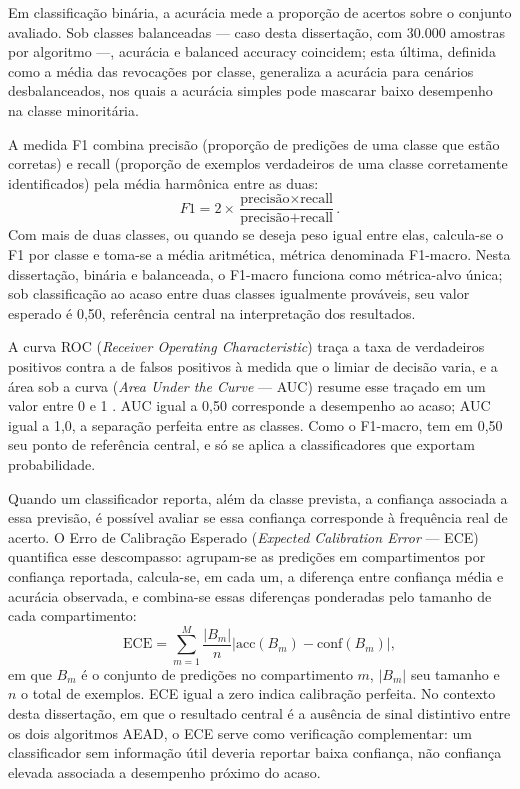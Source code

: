 Em classificação binária, a acurácia mede a proporção de acertos sobre o conjunto avaliado. Sob classes balanceadas --- caso desta dissertação, com 30.000 amostras por algoritmo ---, acurácia e balanced accuracy coincidem; esta última, definida como a média das revocações por classe, generaliza a acurácia para cenários desbalanceados, nos quais a acurácia simples pode mascarar baixo desempenho na classe minoritária.

A medida F1 combina precisão (proporção de predições de uma classe que estão corretas) e recall (proporção de exemplos verdadeiros de uma classe corretamente identificados) pela média harmônica entre as duas:
\begin{equation}
F1 = 2 \times \frac{\text{precisão} \times \text{recall}}{\text{precisão} + \text{recall}}.
\end{equation}
Com mais de duas classes, ou quando se deseja peso igual entre elas, calcula-se o F1 por classe e toma-se a média aritmética, métrica denominada F1-macro. Nesta dissertação, binária e balanceada, o F1-macro funciona como métrica-alvo única; sob classificação ao acaso entre duas classes igualmente prováveis, seu valor esperado é 0,50, referência central na interpretação dos resultados.

A curva ROC (\emph{Receiver Operating Characteristic}) traça a taxa de verdadeiros positivos contra a de falsos positivos à medida que o limiar de decisão varia, e a área sob a curva (\emph{Area Under the Curve} --- AUC) resume esse traçado em um valor entre 0 e 1 \cite{fawcett2006}. AUC igual a 0,50 corresponde a desempenho ao acaso; AUC igual a 1,0, a separação perfeita entre as classes. Como o F1-macro, tem em 0,50 seu ponto de referência central, e só se aplica a classificadores que exportam probabilidade.

Quando um classificador reporta, além da classe prevista, a confiança associada a essa previsão, é possível avaliar se essa confiança corresponde à frequência real de acerto. O Erro de Calibração Esperado (\emph{Expected Calibration Error} --- ECE) quantifica esse descompasso: agrupam-se as predições em compartimentos por confiança reportada, calcula-se, em cada um, a diferença entre confiança média e acurácia observada, e combina-se essas diferenças ponderadas pelo tamanho de cada compartimento:
\begin{equation}
\text{ECE} = \sum_{m=1}^{M} \frac{|B_m|}{n} \left| \text{acc}(B_m) - \text{conf}(B_m) \right|,
\end{equation}
em que $B_m$ é o conjunto de predições no compartimento $m$, $|B_m|$ seu tamanho e $n$ o total de exemplos. ECE igual a zero indica calibração perfeita. No contexto desta dissertação, em que o resultado central é a ausência de sinal distintivo entre os dois algoritmos AEAD, o ECE serve como verificação complementar: um classificador sem informação útil deveria reportar baixa confiança, não confiança elevada associada a desempenho próximo do acaso.

